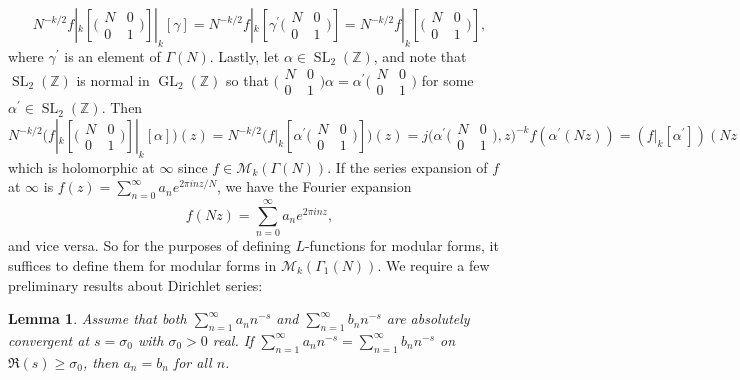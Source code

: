 \documentclass[10pt,leqno,twoside]{article}
\theoremstyle{plain}
\newtheorem{lemma}[lem]{Lemma}
\theoremstyle{definition}
\numberwithin{equation}{section}
\numberwithin{lem}{section}
\DeclareMathOperator{\GL}{GL}
\DeclareMathOperator{\SL}{SL}
\newcommand{\slz}{\SL_2(\mathbb{Z})}
\begin{document}
\[N^{-k/2}f|_k[\big(\!\begin{smallmatrix}
    N & 0 \\ 0 & 1
\end{smallmatrix}\!\big)]|_k[\gamma] = N^{-k/2}f|_k[\gamma^\prime\big(\!\begin{smallmatrix}
    N & 0 \\ 0 & 1
\end{smallmatrix}\!\big)] = N^{-k/2}f|_k[\big(\!\begin{smallmatrix}
    N & 0 \\ 0 & 1
\end{smallmatrix}\!\big)],\] where $\gamma^\prime$ is an element of $\varGamma(N)$. Lastly, let $\alpha\in \slz$, and note that $\slz$ is normal in $\GL_2(\mathbb Z)$ so that $\big(\!\begin{smallmatrix}
    N & 0 \\ 0 & 1
\end{smallmatrix}\!\big)\alpha = \alpha^\prime \big(\!\begin{smallmatrix}
    N & 0 \\ 0 & 1
\end{smallmatrix}\!\big)$ for some $\alpha^\prime\in\slz$. Then 
\[N^{-k/2}\Big(f|_k[\big(\!\begin{smallmatrix}
    N & 0 \\ 0 & 1
\end{smallmatrix}\!\big)]|_k[\alpha]\Big)(z) = N^{-k/2}\Big(f|_k[\alpha^\prime\big(\!\begin{smallmatrix}
    N & 0 \\ 0 & 1
\end{smallmatrix}\!\big)]\Big)(z) = j\big(\alpha^\prime\big(\!\begin{smallmatrix}
    N & 0 \\ 0 & 1
\end{smallmatrix}\!\big),z\big)^{-k}f(\alpha^\prime(Nz)) = (f|_k[\alpha^\prime])(Nz),\] which is holomorphic at $\infty$ since $f\in\mathcal M_k(\varGamma(N))$. If the  series expansion of $f$ at $\infty$ is $f(z) = \sum_{n =0}^\infty a_ne^{2\pi i n z/N}$, we have the Fourier expansion
\[f(Nz) = \sum_{n =0}^\infty a_ne^{2\pi i n z},\] and vice versa. So for the purposes of defining $L$-functions for modular forms, it suffices to define them for modular forms in $\mathcal M_k(\varGamma_1(N))$. We require a few preliminary results about Dirichlet series:
\begin{lemma}\label{lem: miyake lem 3.2.1}
    Assume that both $\sum_{n=1}^\infty a_nn^{-s}$ and $\sum_{n=1}^\infty b_nn^{-s}$ are absolutely convergent at $s = \sigma_0$ with $\sigma_0>0$ real. If $\sum_{n=1}^\infty a_nn^{-s} = \sum_{n=1}^\infty b_nn^{-s}$ on $\Re(s)\geq \sigma_0$, then $a_n = b_n$ for all $n$.
\end{lemma}
\end{document}
